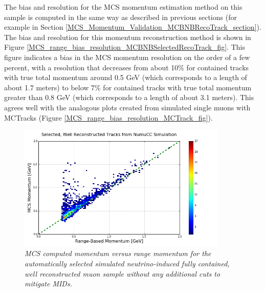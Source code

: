 The bias and resolution for the MCS momentum estimation method on this sample is computed in the same way as described in previous sections (for example in Section \ref{MCS_Momentum_Validation_MCBNBRecoTrack_section}). The bias and resolution for this momentum reconstruction method is shown in Figure \ref{MCS_range_bias_resolution_MCBNBSelectedRecoTrack_fig}. This figure indicates a bias in the MCS momentum resolution on the order of a few percent, with a resolution that decreases from about 10\% for contained tracks with true total momentum around 0.5 GeV (which corresponds to a length of about 1.7 meters) to below 7\% for contained tracks with true total momentum greater than 0.8 GeV (which corresponds to a length of about 3.1 meters). This agrees well with the analogous plots created from simulated single muons with {\sc MCTracks} (Figure \ref{MCS_range_bias_resolution_MCTrack_fig}).


\begin{figure}[ht!]
\begin{center}
\includegraphics[width=100mm]{Figures/MCS_range_comparison_MCBNBSelectedRecoTrack.png}
\end{center}
\caption{\textit{MCS computed momentum versus range momentum for the automatically selected simulated neutrino-induced fully contained, well reconstructed muon sample without any additional cuts to mitigate MIDs.}}
\label{MCS_range_momentum_MCBNBSelectedRecoTrack_noPDGcut_fig}
\end{figure}

